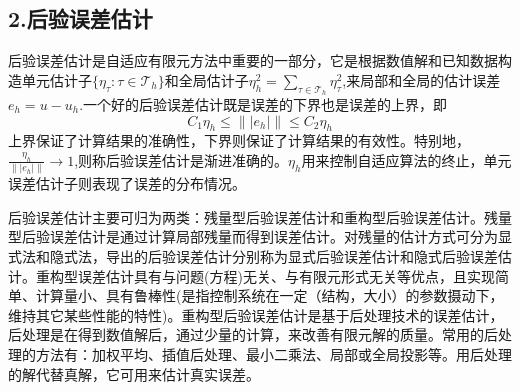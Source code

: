 \documentclass{article}
\begin{document}
\subsection{2.后验误差估计}
后验误差估计是自适应有限元方法中重要的一部分，它是根据数值解和已知数据构造单元估计子$\{\eta_{\tau}:\tau\in\mathcal{T}_h\}$和全局估计子$\eta_h^2=\sum\limits_{\tau\in\mathcal{T}_h}\eta_{\tau}^2$,来局部和全局的估计误差$e_h=u-u_h$.一个好的后验误差估计既是误差的下界也是误差的上界，即
\begin{equation*}
C_1\eta_h\le\left\|\left|e_h\right|\right\|\le C_2\eta_h
\end{equation*}
上界保证了计算结果的准确性，下界则保证了计算结果的有效性。特别地，$\frac{\eta_h}{\left\|\left|e_h\right|\right\|}\rightarrow 1$,则称后验误差估计是渐进准确的。$\eta_h$用来控制自适应算法的终止，单元误差估计子则表现了误差的分布情况。

后验误差估计主要可归为两类：残量型后验误差估计和重构型后验误差估计。残量型后验误差估计是通过计算局部残量而得到误差估计。对残量的估计方式可分为显式法和隐式法，导出的后验误差估计分别称为显式后验误差估计和隐式后验误差估计。重构型误差估计具有与问题(方程)无关、与有限元形式无关等优点，且实现简单、计算量小、具有鲁棒性(是指控制系统在一定（结构，大小）的参数摄动下，维持其它某些性能的特性)。重构型后验误差估计是基于后处理技术的误差估计，后处理是在得到数值解后，通过少量的计算，来改善有限元解的质量。常用的后处理的方法有：加权平均、插值后处理、最小二乘法、局部或全局投影等。用后处理的解代替真解，它可用来估计真实误差。
\end{document}
